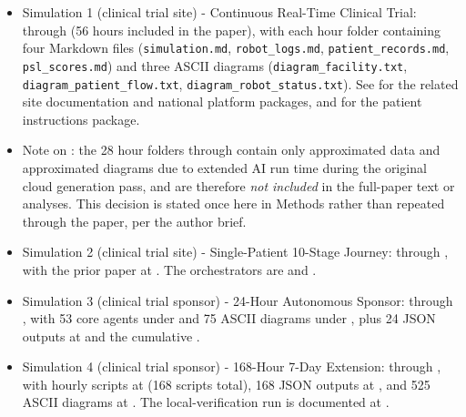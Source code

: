 \begin{itemize}[leftmargin=*]
\item Simulation 1 (clinical trial site) - Continuous Real-Time
Clinical Trial:  through
 (56 hours included in the paper), with each hour
folder containing four Markdown files (\texttt{simulation.md},
\texttt{robot\_logs.md}, \texttt{patient\_records.md},
\texttt{psl\_scores.md}) and three ASCII diagrams
(\texttt{diagram\_facility.txt}, \texttt{diagram\_patient\_flow.txt},
\texttt{diagram\_robot\_status.txt}). See
\cite{kawchak_2026_19176370, kawchak_2026_19244918} for the related
site documentation and national platform packages, and
\cite{kawchak_2026_18810541} for the patient instructions package.

\item Note on : the 28 hour folders
 through
 contain only approximated data and approximated
diagrams due to extended AI run time during the original cloud
generation pass, and are therefore \emph{not included} in the
full-paper text or analyses. This decision is stated once here in
Methods rather than repeated through the paper, per the author brief.

\item Simulation 2 (clinical trial site) - Single-Patient 10-Stage
Journey:  through
, with the prior paper at
. The
orchestrators are  and
 \cite{kawchak_2026_19119939}.

\item Simulation 3 (clinical trial sponsor) - 24-Hour Autonomous
Sponsor: 
through , with 53 core agents under
 and 75 ASCII diagrams
under , plus 24 JSON
outputs at  and the
cumulative 
\cite{kawchak_2026_19396256}.

\item Simulation 4 (clinical trial sponsor) - 168-Hour 7-Day
Extension:  through
, with hourly scripts at
 (168 scripts total), 168
JSON outputs at , and 525 ASCII diagrams
at . The local-verification run is documented
at
\cite{kawchak_2026_19396256}.
\end{itemize}

